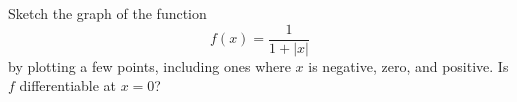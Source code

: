 Sketch the graph of the function
\begin{equation*}
  f(x)=\frac{1}{1+|x|}
\end{equation*}
by plotting a few
points, including ones where $x$ is negative, zero, and positive.
Is $f$ differentiable at $x=0$?
